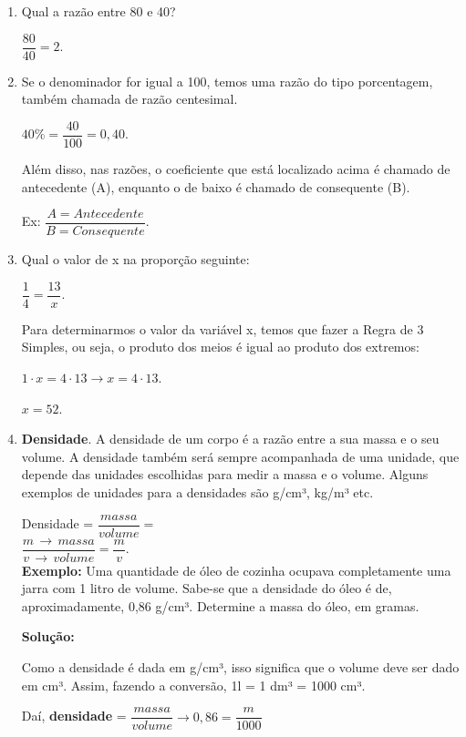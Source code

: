 \begin{multicols*}{2}
\begin{enumerate}
        \item Qual a razão entre 80 e 40?

              $ \dfrac{80}{40} = 2 $.

        \item Se o denominador for igual a 100, temos uma razão do tipo porcentagem, também chamada de razão centesimal.

              $ 40\% = \dfrac{40}{100} = 0,40 $.

              Além disso, nas razões, o coeficiente que está localizado acima é chamado de antecedente (A), enquanto o de baixo é chamado de consequente (B).

              Ex: $ \dfrac{A = Antecedente}{B = Consequente} $.

        \item Qual o valor de x na proporção seguinte:

              $ \dfrac{1}{4} = \dfrac{13}{x} $.

              Para determinarmos o valor da variável x, temos que fazer a Regra de 3 Simples, ou seja, o produto dos meios é igual ao produto dos extremos:

              $ 1 \cdot x = 4 \cdot 13 \to x = 4 \cdot 13 $.

              $ x = 52 $.

        \item \textbf{Densidade}. A densidade de um corpo é a razão entre a sua massa e o seu volume. A densidade também será sempre acompanhada de uma unidade, que depende das unidades escolhidas para medir a massa e o volume. Alguns exemplos de unidades para a densidades são g/cm³, kg/m³ etc.

              Densidade = $ \dfrac{massa}{volume} =$\\

              $\dfrac{m \, \to \, massa}{v \, \to \, volume} = \dfrac{m}{v} $.\\

              \textbf{Exemplo:} Uma quantidade de óleo de cozinha ocupava completamente uma jarra com 1 litro de volume. Sabe-se que a densidade do óleo é de, aproximadamente, 0,86 g/cm³.  Determine a massa do óleo, em gramas.

              \textbf{Solução:}

              Como a densidade é dada em g/cm³, isso significa que o volume deve ser dado em cm³. Assim, fazendo a conversão, 1l = 1 dm³ = 1000 cm³.

              Daí, \textbf{densidade} = $ \dfrac{massa}{volume} \to 0,86 = \dfrac{m}{1000} $\\


\end{enumerate}
\end{multicols*}
